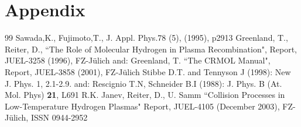 \documentclass[12pt,dvipdfmx]{article}
\begin{document}
\section{Appendix}
\newpage
\begin{thebibliography}{99}
 Sawada,K.,  Fujimoto,T., J. Appl. Phys.78 (5), (1995), p2913
 Greenland, T., Reiter, D.,
                   ``The Role of Molecular Hydrogen in Plasma
                    Recombination", Report, JUEL-3258 (1996), FZ-J\"ulich
                    and: Greenland, T. ``The CRMOL Manual", Report, JUEL-3858 (2001), FZ-J\"ulich
 Stibbe D.T. and Tennyson J (1998): New J. Phys. 1, 2.1-2.9.
and: Rescignio T.N, Schneider B.I (1988): J. Phys. B (At. Mol. Phys)
{\bf 21}, L691
 R.K. Janev, Reiter, D., U. Samm
                   ``Collision Processes in Low-Temperature Hydrogen Plasmas"
Report, JUEL-4105 (December 2003), FZ-J\"ulich, ISSN 0944-2952
 \end{thebibliography}
\end{document}
